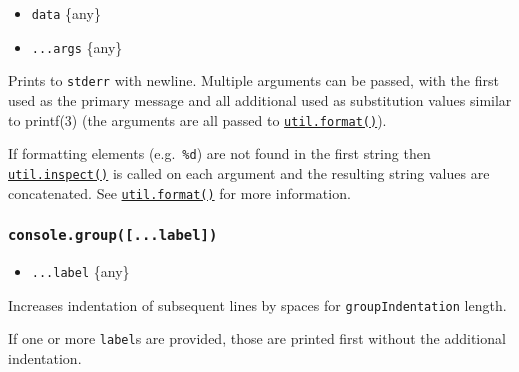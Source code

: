 \begin{itemize}
\tightlist
\item
  \texttt{data} \{any\}
\item
  \texttt{...args} \{any\}
\end{itemize}

Prints to \texttt{stderr} with newline. Multiple arguments can be
passed, with the first used as the primary message and all additional
used as substitution values similar to printf(3) (the arguments are all
passed to
\href{util.md\#utilformatformat-args}{\texttt{util.format()}}).

\begin{Shaded}
\begin{Highlighting}[]
\OperatorTok{=} \OperatorTok{;}
\NormalTok{(}\OperatorTok{,}\OperatorTok{;}
\NormalTok{(}\OperatorTok{,}\OperatorTok{;}
\end{Highlighting}
\end{Shaded}

If formatting elements (e.g.~\texttt{\%d}) are not found in the first
string then
\href{util.md\#utilinspectobject-options}{\texttt{util.inspect()}} is
called on each argument and the resulting string values are
concatenated. See
\href{util.md\#utilformatformat-args}{\texttt{util.format()}} for more
information.

\subsubsection{\texorpdfstring{\texttt{console.group({[}...label{]})}}{console.group({[}...label{]})}}\label{console.group...label}

\begin{itemize}
\tightlist
\item
  \texttt{...label} \{any\}
\end{itemize}

Increases indentation of subsequent lines by spaces for
\texttt{groupIndentation} length.

If one or more \texttt{label}s are provided, those are printed first
without the additional indentation.

